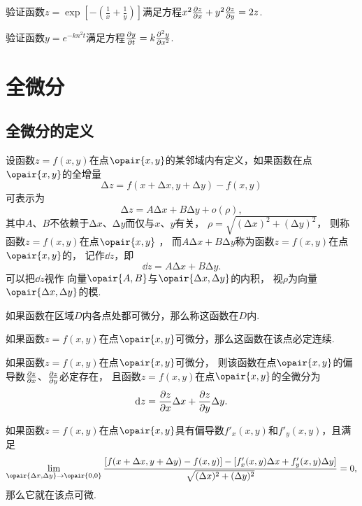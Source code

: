 \begin{example}
验证函数\(z = \exp[-\left(\frac{1}{x}+\frac{1}{y}\right)]\)满足方程\(x^2 \pdv{z}{x} + y^2 \pdv{z}{y} = 2z\).
\end{example}

\begin{example}
验证函数\(y = e^{-k n^2 t}\)满足方程\(\pdv{y}{t} = k \pdv[2]{y}{x}\).
\end{example}

\section{全微分}
\subsection{全微分的定义}
\begin{definition}
设函数\(z=f(x,y)\)在点\(\opair{x,y}\)的某邻域内有定义，如果函数在点\(\opair{x,y}\)的全增量\[
\increment z = f(x+\increment x,y+\increment y)-f(x,y)
\]可表示为\[
\increment z = A \increment x + B \increment y + o(\rho),
\]其中\(A\)、\(B\)不依赖于\(\increment x\)、\(\increment y\)而仅与\(x\)、\(y\)有关，
\(\rho=\sqrt{(\increment x)^2+(\increment y)^2}\)，
则称函数\(z=f(x,y)\)在点\(\opair{x,y}\) ，
而\(A \increment x + B \increment y\)称为函数\(z=f(x,y)\)在点\(\opair{x,y}\)的，
记作\(\dd{z}\)，即\[
\dd{z} = A \increment x + B \increment y.
\]可以把\(\dd{z}\)视作%
向量\(\opair{A,B}\)与\(\opair{\increment x,\increment y}\)的内积，
视\(\rho\)为向量\(\opair{\increment x,\increment y}\)的模.

如果函数在区域\(D\)内各点处都可微分，那么称这函数在\(D\)内.
\end{definition}

\begin{theorem}
如果函数\(z=f(x,y)\)在点\(\opair{x,y}\)可微分，那么这函数在该点必定连续.
\end{theorem}

\begin{theorem}[必要条件]\label{theorem:多元函数微分法.二元函数可微的必要条件}
如果函数\(z=f(x,y)\)在点\(\opair{x,y}\)可微分，
则该函数在点\(\opair{x,y}\)的偏导数\(\pdv{z}{x}\)、\(\pdv{z}{y}\)必定存在，
且函数\(z=f(x,y)\)在点\(\opair{x,y}\)的全微分为\[
\dd{z} = \pdv{z}{x} \Delta x + \pdv{z}{y} \Delta y.
\]
\end{theorem}

\begin{corollary}
如果函数\(z=f(x,y)\)在点\(\opair{x,y}\)具有偏导数\(f'_x(x,y)\)和\(f'_y(x,y)\)，且满足\[
\lim\limits_{\opair{\increment x,\increment y}\to\opair{0,0}}
 \frac{[f(x+\increment x,y+\increment y)-f(x,y)]-[f'_x(x,y) \increment x + f'_y(x,y) \increment y]}{\sqrt{(\increment x)^2+(\increment y)^2}} = 0,
\]那么它就在该点可微.
\end{corollary}

